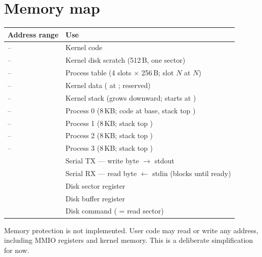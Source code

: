 \documentclass[11pt]{article}
\begin{document}
\section{Memory map}

\begin{center}
\begin{tabular}{@{}L{4.4cm} L{9.0cm}@{}}
\toprule
\textbf{Address range} & \textbf{Use} \\
\midrule
{}-- & Kernel code \\
-- & Kernel disk scratch (512\,B, one sector) \\
-- & Process table (4 slots $\times$ 256\,B; slot $N$ at $N$) \\
-- & Kernel data ( at ; reserved) \\
-- & Kernel stack (grows downward;  starts at ) \\
-- & Process 0 (8\,KB; code at base, stack top ) \\
-- & Process 1 (8\,KB; stack top ) \\
-- & Process 2 (8\,KB; stack top ) \\
-- & Process 3 (8\,KB; stack top ) \\
\addlinespace[0.3em]
 & Serial TX --- write byte $\rightarrow$ stdout \\
 & Serial RX --- read byte $\leftarrow$ stdin (blocks until ready) \\
 & Disk sector register \\
 & Disk buffer register \\
 & Disk command ( = read sector) \\
\bottomrule
\end{tabular}
\end{center}

\begin{blissnote}[Warning]
Memory protection is not implemented. User code may read or write any address,
including MMIO registers and kernel memory. This is a deliberate simplification
for now.
\end{blissnote}
\end{document}
